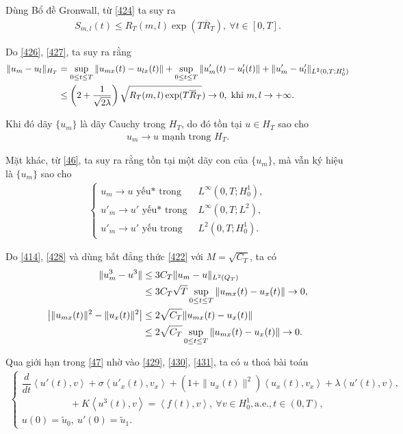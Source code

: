 \documentclass[12pt,a4paper]{article}
\theoremstyle{definition}
\theoremstyle{definition}
\begin{document}
Dùng Bổ đề Gronwall, từ \eqref{424} ta suy ra
\begin{align} \label{427}
    S_{m,l}(t) \le R_T(m,l) \exp (T\overline{R}_T), \ \forall t \in [0,T].
\end{align}

Do \eqref{426}, \eqref{427}, ta suy ra rằng
\begin{align} \label{428}
    \|u_m - u_l\|_{H_T} &= \sup_{0 \le t \le T} \|u_{mx}(t) - u_{lx}(t)\| + \sup_{0 \le t \le T} \|u'_m(t) - u'_l(t)\| + \|u'_m - u'_l\|_{L^2(0,T;H^1_0)} \notag \\
    &\le \left(2 + \frac{1}{\sqrt{2\lambda}}\right) \sqrt{R_T(m,l) \exp(T\overline{R}_T}) \to 0, \text{ khi } m,l \to +\infty.
\end{align}

Khi đó dãy $\{u_m\}$ là dãy Cauchy trong $H_T$, do đó tồn tại $u \in H_T$ sao cho
\begin{align} \label{429}
    u_m \to u \text{ mạnh trong } H_T.
\end{align}

Mặt khác, từ \eqref{46}, ta suy ra rằng tồn tại một dãy con của $\{u_m\}$, mà vẫn ký hiệu là $\{u_m\}$ sao cho
\begin{align} \label{430}
\begin{cases}
    u_m \to u \text{ yếu* trong } &L^\infty(0,T;H^1_0), \\
    u'_m \to u' \text{ yếu* trong } &L^\infty(0,T;L^2), \\
    u'_m \to u' \text{ yếu trong } &L^2(0,T;H^1_0).
\end{cases}
\end{align}

Do \eqref{414}, \eqref{428} và dùng bất đẳng thức \eqref{422} với $M = \sqrt{C_T}$, ta có
\begin{align} \label{431}
    \|u^3_m - u^3\| &\le 3C_T \|u_m - u\|_{L^2(Q_T)} \\
    &\le 3C_T\sqrt{T} \sup_{0 \le t \le T} \|u_{mx}(t) - u_x(t)\| \to 0, \notag \\
    \left|\|u_{mx}(t)\|^2 - \|u_x(t)\|^2\right| &\le 2\sqrt{C_T} \|u_{mx}(t) - u_x(t)\| \notag \\
    &\le 2\sqrt{C_T} \sup_{0 \le t \le T} \|u_{mx}(t) - u_x(t) \| \to 0. \notag
\end{align}

Qua giới hạn trong \eqref{47} nhờ vào \eqref{429}, \eqref{430}, \eqref{431}, ta có $u$ thoả bài toán
\begin{align} \label{432}
\begin{cases}
    \dfrac{d}{dt}\left<u'(t),v\right> + \sigma\left<u'_x(t),v_x\right>
    + \left(1 + \|u_x(t)\|^2\right)\left<u_x(t),v_x\right> + \lambda \left<u'(t),v\right>, \\
    \quad \quad \quad \quad \quad + K\left<u^3(t),v\right> = \left<f(t),v\right>,\ \forall v \in H^1_0, \text{a.e.}, t \in (0,T), \\
    u(0) = \tilde{u}_0,\: u'(0) = \tilde{u}_1.
\end{cases}
\end{align}
\end{document}
